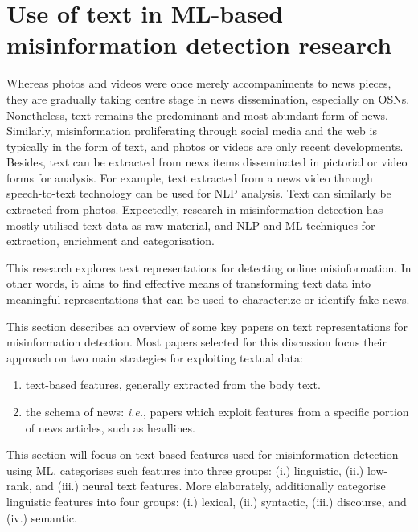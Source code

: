 \section{Use of text in ML-based misinformation detection research}
\label{sec:2-text}

Whereas photos and videos were once merely accompaniments to news pieces, they are gradually taking centre stage in news dissemination, especially on \acp{OSN}. Nonetheless, text remains the predominant and most abundant form of news. Similarly, misinformation proliferating through social media and the web is typically in the form of text, and photos or videos are only recent developments. Besides, text can be extracted from news items disseminated in pictorial or video forms for analysis. For example, text extracted from a news video through speech-to-text technology can be used for \ac{NLP} analysis. Text can similarly be extracted from photos. Expectedly, research in misinformation detection has mostly utilised text data as raw material, and \ac{NLP} and \ac{ML} techniques for extraction, enrichment and categorisation.

This research explores text representations for detecting online misinformation. In other words, it aims to find effective means of transforming text data into meaningful representations that can be used to characterize or identify fake news.

This section describes an overview of some key papers on text representations for misinformation detection. Most papers selected for this discussion focus their approach on two main strategies for exploiting textual data:

\begin{enumerate}
    \item text-based features, generally extracted from the body text.
    \item the schema of news: \emph{i.e.}, papers which exploit features from a specific portion of news articles, such as headlines.
\end{enumerate}

This section will focus on text-based features used for misinformation detection using \ac{ML}.  categorises such features into three groups: (i.) linguistic, (ii.) low-rank,  and (iii.) neural text features. More elaborately,  additionally categorise linguistic features into four groups: (i.) lexical, (ii.) syntactic, (iii.) discourse, and (iv.) semantic.

